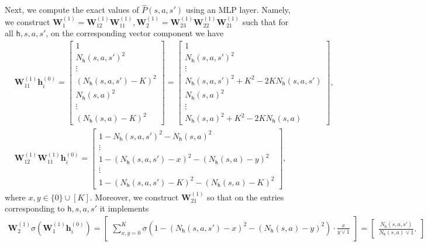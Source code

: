 \documentclass[10pt]{article}
\newcommand{\<}{\left\langle}
\renewcommand{\>}{\right\rangle}
\newcommand{\state}{{s}}
\newcommand{\action}{{a}}
\newcommand{\Numepi}{{K}}
\newcommand{\esttransit}{\widehat{P}}
\newcommand{\Numvi}{{N}}
\def\bW{{\mathbf W}}
\def\bh{{\mathbf h}}
\def\sh{{\mathsf{h}}}
\begin{document}
Next, we compute the exact values of $\esttransit(\state,\action,\state')$ using an MLP layer. Namely, 
we  construct $\bW^{(1)}_1=\bW^{(1)}_{12}\bW^{(1)}_{11},\bW^{(1)}_2=\bW^{(1)}_{23}\bW^{(1)}_{22}\bW^{(1)}_{21}$  such that for all $\sh,\state,\action,\state'$, on the corresponding vector component we have
\begin{align*}
   & \bW^{(1)}_{11}\bh_i^{(0)}=     \begin{bmatrix}
    1\\
       \Numvi_\sh(\state,\action,\state')^2 \\\vdots
       \\
        (\Numvi_\sh(\state,\action,\state')-\Numepi)^2\\
         \Numvi_\sh(\state,\action)^2 \\\vdots
       \\
        (\Numvi_\sh(\state,\action)-\Numepi)^2
    \end{bmatrix}= \begin{bmatrix}
    1\\
       \Numvi_\sh(\state,\action,\state')^2 \\\vdots
       \\
        \Numvi_\sh(\state,\action,\state')^2+\Numepi^2-2\Numepi\Numvi_\sh(\state,\action,\state')\\
          \Numvi_\sh(\state,\action)^2 \\\vdots
       \\
        \Numvi_\sh(\state,\action)^2+\Numepi^2-2\Numepi\Numvi_\sh(\state,\action)
    \end{bmatrix},
    \\
&\bW^{(1)}_{12}\bW^{(1)}_{11}\bh_i^{(0)}=     \begin{bmatrix}
    1-
       \Numvi_\sh(\state,\action,\state')^2 - \Numvi_\sh(\state,\action)^2 \\\vdots
       \\ 1-
       (\Numvi_\sh(\state,\action,\state')-x)^2 - (\Numvi_\sh(\state,\action)-y)^2 \\\vdots\\
       1- (\Numvi_\sh(\state,\action,\state')-\Numepi)^2-(\Numvi_\sh(\state,\action)-\Numepi)^2
    \end{bmatrix} ,
\end{align*} where $x,y\in\{0\}\cup[\Numepi]$. Moreover,  we construct $\bW^{(1)}_{21}$ so that on the entries corresponding to $\sh,\state,\action,\state'$ it implements  
\begin{align*}
\bW_{2}^{(1)}\sigma(\bW_{1}^{(1)}\bh_i^{(0)})
    =\begin{bmatrix}
        \sum_{x,y=0}^{\Numepi}\sigma(1- (\Numvi_\sh(\state,\action,\state')-x)^2 - (\Numvi_\sh(\state,\action)-y)^2)\cdot\frac{x}{y\vee1}
    \end{bmatrix}=\begin{bmatrix}
        \frac{\Numvi_\sh(\state,\action,\state')}{\Numvi_\sh(\state,\action)\vee1}.
    \end{bmatrix}
\end{align*} 
\end{document}
